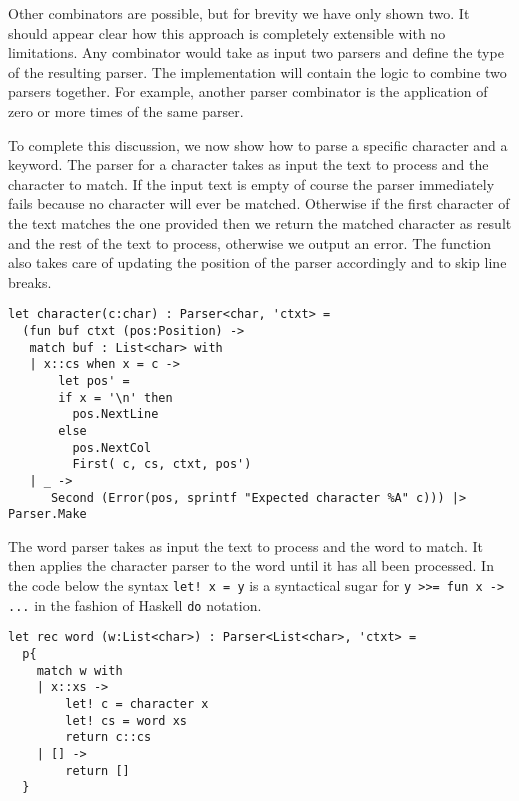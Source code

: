 \noindent
Other combinators are possible, but for brevity we have only shown two. It should appear clear how this approach is completely extensible with no limitations. Any combinator would take as input two parsers and define the type of the resulting parser. The implementation will contain the logic to combine two parsers together. For example, another parser combinator is the application of zero or more times of the same parser.

To complete this discussion, we now show how to parse a specific character and a keyword. The parser for a character takes as input the text to process and the character to match. If the input text is empty of course the parser immediately fails because no character will ever be matched. Otherwise if the first character of the text matches the one provided then we return the matched character as result and the rest of the text to process, otherwise we output an error. The function also takes care of updating the position of the parser accordingly and to skip line breaks.

\begin{lstlisting}
let character(c:char) : Parser<char, 'ctxt> = 
  (fun buf ctxt (pos:Position) ->
   match buf : List<char> with
   | x::cs when x = c -> 
       let pos' = 
       if x = '\n' then 
         pos.NextLine 
       else 
         pos.NextCol
         First( c, cs, ctxt, pos')
   | _ -> 
      Second (Error(pos, sprintf "Expected character %A" c))) |> Parser.Make
\end{lstlisting}

\noindent
The word parser takes as input the text to process and the word to match. It then applies the character parser to the word until it has all been processed. In the code below the syntax \texttt{let! x = y} is a syntactical sugar for \texttt{y >>= fun x -> ...} in the fashion of Haskell \texttt{do} notation.

\begin{lstlisting}
let rec word (w:List<char>) : Parser<List<char>, 'ctxt> =
  p{
    match w with
    | x::xs ->
        let! c = character x
        let! cs = word xs
        return c::cs
    | [] -> 
        return []
  }
\end{lstlisting}

